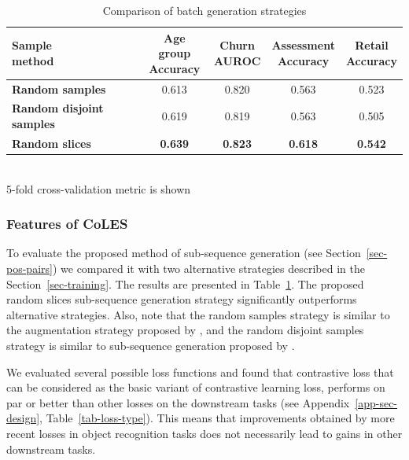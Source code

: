\documentclass[sigconf]{acmart}
\begin{document}
\begin{table}
\centering
\caption{Comparison of batch generation strategies}
\begin{tabularx}{\linewidth}{Xcccc}
\toprule
\makecell{\textbf{Sample} \\ \textbf{method}} &
\makecell{\textbf{Age group} \\ \small{Accuracy}} &
\makecell{\textbf{Churn} \\ \small{AUROC}} &
\makecell{\textbf{Assessment} \\ \small{Accuracy}} &
\makecell{\textbf{Retail} \\ \small{Accuracy}} \\
\midrule
\textbf{Random samples} & 0.613 & 0.820 & 0.563 & 0.523 \\
\textbf{Random disjoint samples} & 0.619 & 0.819 & 0.563 & 0.505 \\
\textbf{Random slices} & \textbf{0.639} & \textbf{0.823} & \textbf{0.618} & \textbf{0.542} \\
\bottomrule
\end{tabularx} \\
\small{5-fold cross-validation metric is shown}
\label{tab-pair-gen}
\end{table}

\subsubsection{Features of CoLES}

To evaluate the proposed method of sub-sequence generation (see Section~\ref{sec-pos-pairs}) we compared it with two alternative strategies described in the Section~\ref{sec-training}. The results are presented in Table~\ref{tab-pair-gen}. The proposed random slices sub-sequence generation strategy significantly outperforms alternative strategies.
Also, note that the random samples strategy is similar to the augmentation strategy proposed by \cite{Yao2020SelfsupervisedLF}, and the random disjoint samples strategy is similar to sub-sequence generation proposed by \cite{Ma2020DisentangledSI}.

We evaluated several possible loss functions and found that contrastive loss that can be considered as the basic variant of contrastive learning loss, performs on par or better than other losses on the downstream tasks (see Appendix~\ref{app-sec-design}, Table~\ref{tab-loss-type}). This means that improvements obtained by more recent losses in object recognition tasks does not necessarily lead to gains in other downstream tasks.
\end{document}
